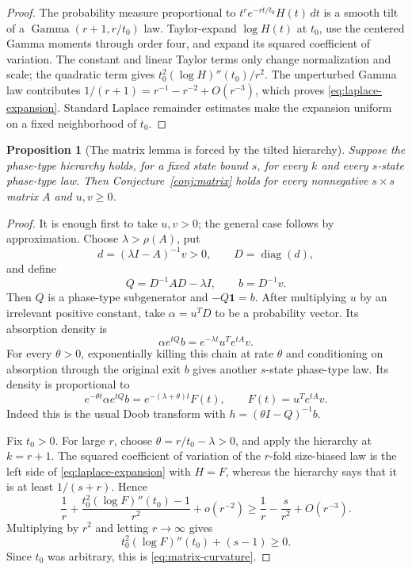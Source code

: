 \documentclass[11pt]{article}
\newtheorem{proposition}[theorem]{Proposition}
\theoremstyle{remark}
\begin{document}
\begin{proof}
The probability measure proportional to
$t^re^{-rt/t_0}H(t)\,dt$ is a smooth tilt of a
$\operatorname{Gamma}(r+1,r/t_0)$ law.  Taylor-expand
$\log H(t)$ at $t_0$, use the centered Gamma moments through order four,
and expand its squared coefficient of variation.  The constant and linear
Taylor terms only change normalization and scale; the quadratic term gives
$t_0^2(\log H)''(t_0)/r^2$.  The unperturbed Gamma law contributes
$1/(r+1)=r^{-1}-r^{-2}+O(r^{-3})$, which proves
\eqref{eq:laplace-expansion}.  Standard Laplace remainder estimates make the
expansion uniform on a fixed neighborhood of $t_0$.
\end{proof}

\begin{proposition}[The matrix lemma is forced by the tilted hierarchy]
\label{prop:converse}
Suppose the phase-type hierarchy holds, for a fixed state bound $s$, for
every $k$ and every $s$-state phase-type law.  Then
Conjecture~\ref{conj:matrix} holds for every nonnegative $s\times s$ matrix
$A$ and $u,v\geq0$.
\end{proposition}

\begin{proof}
It is enough first to take $u,v>0$; the general case follows by
approximation.  Choose $\lambda>\rho(A)$, put
\[
 d=(\lambda I-A)^{-1}v>0,\qquad D=\operatorname{diag}(d),
\]
and define
\[
 Q=D^{-1}AD-\lambda I,\qquad b=D^{-1}v.
\]
Then $Q$ is a phase-type subgenerator and $-Q\mathbf1=b$.  After multiplying
$u$ by an irrelevant positive constant, take
$\alpha=u^TD$ to be a probability vector.  Its absorption density
is
\[
 \alpha e^{tQ}b=e^{-\lambda t}u^Te^{tA}v.
\]
For every $\theta>0$, exponentially killing this chain at rate $\theta$
and conditioning on absorption through the original exit $b$ gives another
$s$-state phase-type law.  Its density is proportional to
\[
 e^{-\theta t}\alpha e^{tQ}b
 =e^{-(\lambda+\theta)t}F(t),
 \qquad F(t)=u^Te^{tA}v.
\]
Indeed this is the usual Doob transform with
$h=(\theta I-Q)^{-1}b$.

Fix $t_0>0$.  For large $r$, choose
$\theta=r/t_0-\lambda>0$, and apply the hierarchy at $k=r+1$.
The squared coefficient of variation of the $r$-fold size-biased law is
the left side of \eqref{eq:laplace-expansion} with $H=F$, whereas the
hierarchy says that it is at least $1/(s+r)$.  Hence
\[
 \frac1r+\frac{t_0^2(\log F)''(t_0)-1}{r^2}+o(r^{-2})
 \geq
 \frac1r-\frac{s}{r^2}+O(r^{-3}).
\]
Multiplying by $r^2$ and letting $r\to\infty$ gives
\[
 t_0^2(\log F)''(t_0)+(s-1)\geq0.
\]
Since $t_0$ was arbitrary, this is
\eqref{eq:matrix-curvature}.
\end{proof}
\end{document}
